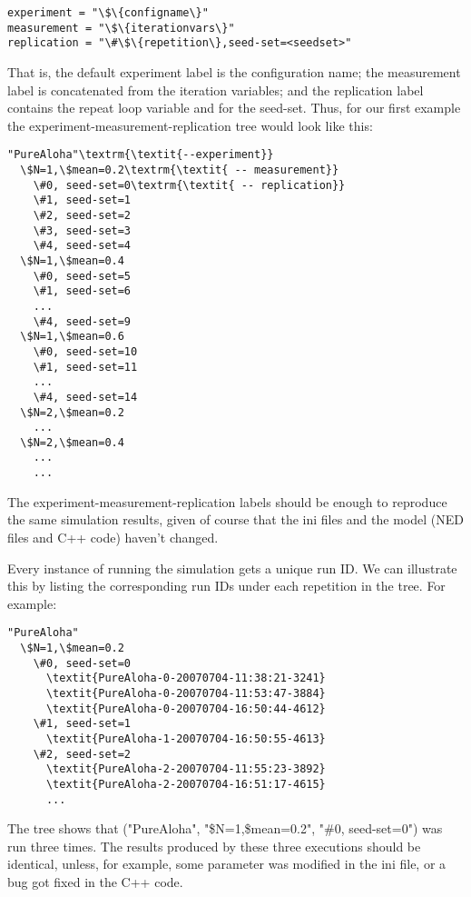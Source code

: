 \begin{Verbatim}[commandchars=\\\{\}]
experiment = "\$\{configname\}"
measurement = "\$\{iterationvars\}"
replication = "\#\$\{repetition\},seed-set=<seedset>"
\end{Verbatim}


That is, the default experiment label is the configuration name; the
measurement label is concatenated from the iteration variables; and the
replication label contains the repeat loop variable and for the
seed-set. Thus, for our first example the
experiment-measurement-replication tree would look like this:

\begin{Verbatim}[commandchars=\\\{\}]
"PureAloha"\textrm{\textit{--experiment}}
  \$N=1,\$mean=0.2\textrm{\textit{ -- measurement}}
    \#0, seed-set=0\textrm{\textit{ -- replication}}
    \#1, seed-set=1
    \#2, seed-set=2
    \#3, seed-set=3
    \#4, seed-set=4
  \$N=1,\$mean=0.4
    \#0, seed-set=5
    \#1, seed-set=6
    ...
    \#4, seed-set=9
  \$N=1,\$mean=0.6
    \#0, seed-set=10
    \#1, seed-set=11
    ...
    \#4, seed-set=14
  \$N=2,\$mean=0.2
    ...
  \$N=2,\$mean=0.4
    ...
    ...
\end{Verbatim}

The experiment-measurement-replication labels should be enough to
reproduce the same simulation results, given of course that the ini
files and the model (NED files and C++ code) haven't changed.

Every instance of running the simulation gets a unique run ID. We can
illustrate this by listing the corresponding run IDs under each
repetition in the tree. For example:

\begin{Verbatim}[commandchars=\\\{\}]
"PureAloha"
  \$N=1,\$mean=0.2
    \#0, seed-set=0
      \textit{PureAloha-0-20070704-11:38:21-3241}
      \textit{PureAloha-0-20070704-11:53:47-3884}
      \textit{PureAloha-0-20070704-16:50:44-4612}
    \#1, seed-set=1
      \textit{PureAloha-1-20070704-16:50:55-4613}
    \#2, seed-set=2
      \textit{PureAloha-2-20070704-11:55:23-3892}
      \textit{PureAloha-2-20070704-16:51:17-4615}
      ...
\end{Verbatim}


The tree shows that ("PureAloha", "\$N=1,\$mean=0.2", "\#0, seed-set=0")
was run three times. The results produced
by these three executions should be identical, unless, for example,
some parameter was modified in the ini file, or a bug got fixed in the
C++ code.

